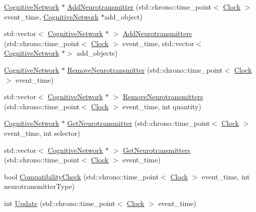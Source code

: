 \begin{DoxyCompactItemize}
\item 
\mbox{\hyperlink{classCognitiveNetwork}{Cognitive\+Network}} $\ast$ \mbox{\hyperlink{classNeuroreceptor_a900b21f6feb6334d4ff8a3fd5244bf05}{Add\+Neurotransmitter}} (std\+::chrono\+::time\+\_\+point$<$ \mbox{\hyperlink{universe_8h_a0ef8d951d1ca5ab3cfaf7ab4c7a6fd80}{Clock}} $>$ event\+\_\+time, \mbox{\hyperlink{classCognitiveNetwork}{Cognitive\+Network}} $\ast$add\+\_\+object)
\item 
std\+::vector$<$ \mbox{\hyperlink{classCognitiveNetwork}{Cognitive\+Network}} $\ast$ $>$ \mbox{\hyperlink{classNeuroreceptor_a2e4cbd9debd555091923f57f8aa11fe4}{Add\+Neurotransmitters}} (std\+::chrono\+::time\+\_\+point$<$ \mbox{\hyperlink{universe_8h_a0ef8d951d1ca5ab3cfaf7ab4c7a6fd80}{Clock}} $>$ event\+\_\+time, std\+::vector$<$ \mbox{\hyperlink{classCognitiveNetwork}{Cognitive\+Network}} $\ast$$>$ add\+\_\+objects)
\item 
\mbox{\hyperlink{classCognitiveNetwork}{Cognitive\+Network}} $\ast$ \mbox{\hyperlink{classNeuroreceptor_a7e94ac827de7abbac585639edfd4f985}{Remove\+Neurotransmitter}} (std\+::chrono\+::time\+\_\+point$<$ \mbox{\hyperlink{universe_8h_a0ef8d951d1ca5ab3cfaf7ab4c7a6fd80}{Clock}} $>$ event\+\_\+time)
\item 
std\+::vector$<$ \mbox{\hyperlink{classCognitiveNetwork}{Cognitive\+Network}} $\ast$ $>$ \mbox{\hyperlink{classNeuroreceptor_ad760106ce6194ac02959c1882bd0f327}{Remove\+Neurotransmitters}} (std\+::chrono\+::time\+\_\+point$<$ \mbox{\hyperlink{universe_8h_a0ef8d951d1ca5ab3cfaf7ab4c7a6fd80}{Clock}} $>$ event\+\_\+time, int quantity)
\item 
\mbox{\hyperlink{classCognitiveNetwork}{Cognitive\+Network}} $\ast$ \mbox{\hyperlink{classNeuroreceptor_a526d41738265399c19c67068db450851}{Get\+Neurotransmitter}} (std\+::chrono\+::time\+\_\+point$<$ \mbox{\hyperlink{universe_8h_a0ef8d951d1ca5ab3cfaf7ab4c7a6fd80}{Clock}} $>$ event\+\_\+time, int selector)
\item 
std\+::vector$<$ \mbox{\hyperlink{classCognitiveNetwork}{Cognitive\+Network}} $\ast$ $>$ \mbox{\hyperlink{classNeuroreceptor_a4267220ee11105b7628bf39049ef7cc5}{Get\+Neurotransmitters}} (std\+::chrono\+::time\+\_\+point$<$ \mbox{\hyperlink{universe_8h_a0ef8d951d1ca5ab3cfaf7ab4c7a6fd80}{Clock}} $>$ event\+\_\+time)
\item 
bool \mbox{\hyperlink{classNeuroreceptor_a5d54ca353f0be78522aacc4fca06db63}{Compatibility\+Check}} (std\+::chrono\+::time\+\_\+point$<$ \mbox{\hyperlink{universe_8h_a0ef8d951d1ca5ab3cfaf7ab4c7a6fd80}{Clock}} $>$ event\+\_\+time, int neurotransmitter\+Type)
\item 
int \mbox{\hyperlink{classNeuroreceptor_ab8f288a095fb028793e7246a42de233b}{Update}} (std\+::chrono\+::time\+\_\+point$<$ \mbox{\hyperlink{universe_8h_a0ef8d951d1ca5ab3cfaf7ab4c7a6fd80}{Clock}} $>$ event\+\_\+time)
\end{DoxyCompactItemize}
